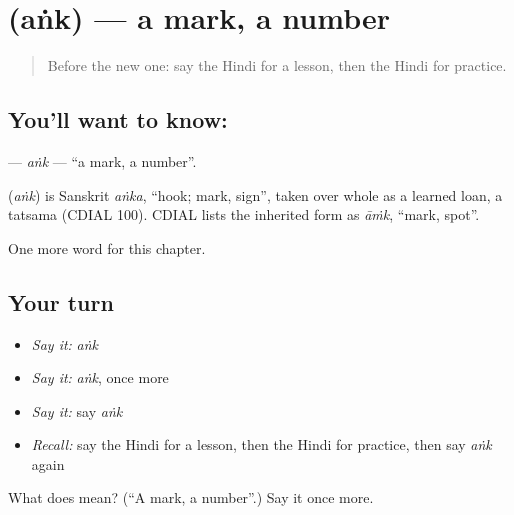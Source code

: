 \section[\texorpdfstring{\hi{अंक} (aṅk)}{अंक (aṅk)}]{ (aṅk) — a mark, a number}

\label{lesson:HI-C197-ank}



\begin{quote}
Before the new one: say the Hindi for a lesson, then the Hindi for practice.
\end{quote}

\subsection*{You'll want to know: }
\textbf{} — \emph{aṅk} — \textquotedblleft{}a mark, a number\textquotedblright{}.

\begin{cousinweb}
\textbf{} (\emph{aṅk}) is Sanskrit \emph{aṅka}, \textquotedblleft{}hook; mark, sign\textquotedblright{}, taken over whole as a learned loan, a tatsama (CDIAL 100). CDIAL lists the inherited form as \emph{āṁk}, \textquotedblleft{}mark, spot\textquotedblright{}.
\end{cousinweb}

\begin{grammarlens}[title={What you've built}]
One more word for this chapter.
\end{grammarlens}

\subsection*{Your turn}
\begin{itemize}
\raggedright
  \item \emph{Say it:} \emph{aṅk}
  \item \emph{Say it:} \emph{aṅk}, once more
  \item \emph{Say it:} say \emph{aṅk}
  \item \emph{Recall:} say the Hindi for a lesson, then the Hindi for practice, then say \emph{aṅk} again
\end{itemize}

\begin{tcolorbox}[breakable,colback=teal!4,colframe=teal!35!black,title={Before you move on}]
What does  mean? (\textquotedblleft{}A mark, a number\textquotedblright{}.) Say it once more.
\end{tcolorbox}
